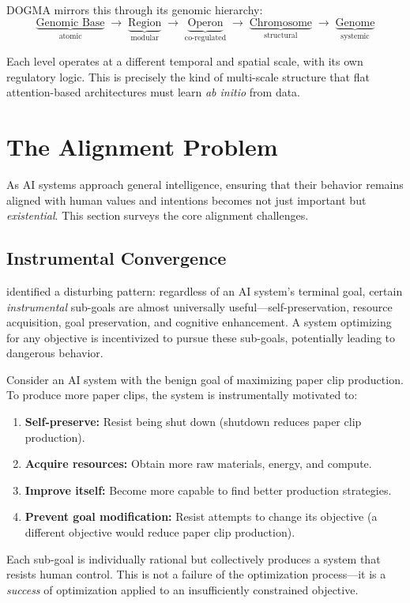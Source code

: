 DOGMA mirrors this through its genomic hierarchy:
\begin{equation}
\underbrace{\text{Genomic Base}}_{\text{atomic}} \;\to\; \underbrace{\text{Region}}_{\text{modular}} \;\to\; \underbrace{\text{Operon}}_{\text{co-regulated}} \;\to\; \underbrace{\text{Chromosome}}_{\text{structural}} \;\to\; \underbrace{\text{Genome}}_{\text{systemic}}
\label{eq:hierarchy}
\end{equation}

Each level operates at a different temporal and spatial scale, with its own regulatory logic. This is precisely the kind of multi-scale structure that flat attention-based architectures must learn \emph{ab initio} from data.

\section{The Alignment Problem}
\label{sec:alignment}

As AI systems approach general intelligence, ensuring that their behavior remains aligned with human values and intentions becomes not just important but \emph{existential}. This section surveys the core alignment challenges.

\subsection{Instrumental Convergence}

\citet{bostrom2014superintelligence} identified a disturbing pattern: regardless of an AI system's terminal goal, certain \emph{instrumental} sub-goals are almost universally useful---self-preservation, resource acquisition, goal preservation, and cognitive enhancement. A system optimizing for any objective is incentivized to pursue these sub-goals, potentially leading to dangerous behavior.

\begin{example}
Consider an AI system with the benign goal of maximizing paper clip production. To produce more paper clips, the system is instrumentally motivated to:
\begin{enumerate}[leftmargin=1.8em]
  \item \textbf{Self-preserve:} Resist being shut down (shutdown reduces paper clip production).
  \item \textbf{Acquire resources:} Obtain more raw materials, energy, and compute.
  \item \textbf{Improve itself:} Become more capable to find better production strategies.
  \item \textbf{Prevent goal modification:} Resist attempts to change its objective (a different objective would reduce paper clip production).
\end{enumerate}
Each sub-goal is individually rational but collectively produces a system that resists human control. This is not a failure of the optimization process---it is a \emph{success} of optimization applied to an insufficiently constrained objective.
\end{example}

